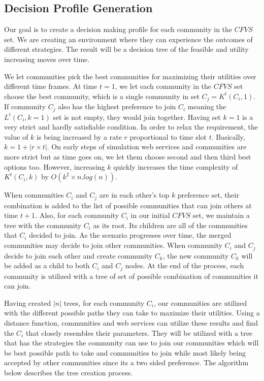 \documentclass[10pt,journal,cspaper,compsoc]{IEEEtran}
\begin{document}
\subsection{Decision Profile Generation}\label{ss:learningmodel}

Our goal is to create a decision making profile for each community in the $CFVS$ set. We are creating an environment where they can experience the outcomes of different strategies. The result will be a decision tree of the feasible and utility increasing moves over time.

We let communities pick the best communities for maximizing their utilities over different time frames. At time $t = 1$, we let each community in the $CFVS$ set choose the best community, which is a single community in set $C_j = K^t(C_i, 1)$. If community $C_j$ also has the highest preference to join $C_i$ meaning the $L^t(C_i, k=1)$ set is not empty, they would join together. Having set $k = 1$ is a very strict and hardly satisfiable condition. In order to relax the requirement, the value of $k$ is being increased by a rate $r$ proportional to time slot $t$. Basically, $k = 1 + |r \times t|$. On early steps of simulation web services and communities are more strict but as time goes on, we let them choose second and then third best options too. However, increasing $k$ quickly increases the time complexity of $K^t(C_i, k)$ by $O(k^2 \times n.log(n))$. 

When communities $C_i$ and $C_j$ are in each other's top $k$ preference set, their combination is added to the list of possible communities that can join others at time $t+1$. Also, for each community $C_i$ in our initial $CFVS$ set, we maintain a tree with the community $C_i$ as its root. Its children are all of the communities that $C_i$ decided to join. As the scenario progresses over time, the merged communities may decide to join other communities. When community $C_i$ and $C_j$ decide to join each other and create community $C_k$, the new community $C_k$ will be added as a child to both $C_i$ and $C_j$ nodes. At the end of the process, each community is utilized with a tree of set of possible combination of communities it can join.

Having created $|n|$ trees, for each community $C_i$, our communities are utilized with the different possible paths they can take to maximize their utilities. Using a distance function, communities and web services can utilize these results and find the $C_i$ that closely resembles their parameters. They will be utilized with a tree that has the strategies the community can use to join our communities which will be best possible path to take and communities to join while most likely being accepted by other communities since its a two sided preference. The algorithm below describes the tree creation process.
\end{document}
